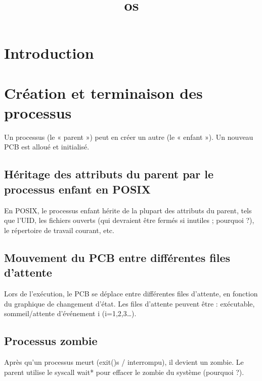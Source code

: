 \documentclass[12pt]{report}
\title{os}
\author{}
\begin{document}
\maketitle
\tableofcontents
\newpage

\section{Introduction}
\section{Création et terminaison des processus}
Un processus (le « parent ») peut en créer un autre (le « enfant »). Un nouveau PCB est alloué et initialisé. 

\subsection{Héritage des attributs du parent par le processus enfant en POSIX}
En POSIX, le processus enfant hérite de la plupart des attributs du parent, tels que l'UID, les fichiers ouverts (qui devraient être fermés si inutiles ; pourquoi ?), le répertoire de travail courant, etc.

\subsection{Mouvement du PCB entre différentes files d'attente}
Lors de l'exécution, le PCB se déplace entre différentes files d'attente, en fonction du graphique de changement d'état. Les files d'attente peuvent être : exécutable, sommeil/attente d'événement i (i=1,2,3…).

\subsection{Processus zombie}
Après qu'un processus meurt (exit()s / interrompu), il devient un zombie. Le parent utilise le syscall wait* pour effacer le zombie du système (pourquoi ?).
\end{document}
